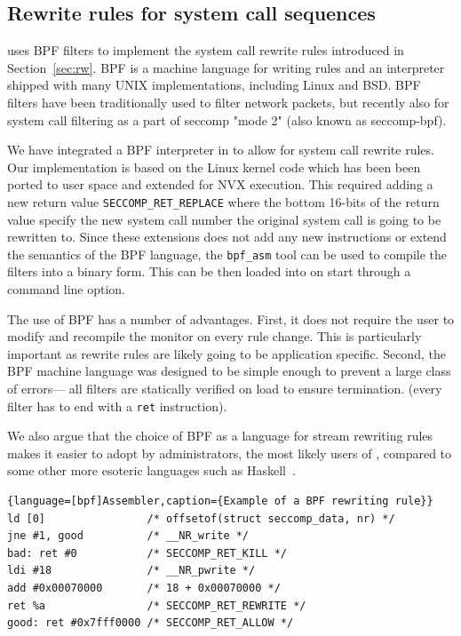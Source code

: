 
\subsection{Rewrite rules for system call sequences}
\label{sec:patternmatching}

\nx uses BPF filters to implement the system call rewrite rules introduced in
Section~\ref{sec:rw}.  BPF is a machine language for writing rules and an
interpreter shipped with many UNIX implementations, including Linux and BSD.
BPF filters have been traditionally used to filter network packets, but
recently also for system call filtering as a part of seccomp "mode 2" (also
known as seccomp-bpf).

We have integrated a BPF interpreter in \nx to allow for system call rewrite
rules. Our implementation is based on the Linux kernel code which has been been
ported to user space and extended for NVX execution.  This required adding a
new return value \lstinline`SECCOMP_RET_REPLACE` where the bottom 16-bits of
the return value specify the new system call number the original system call is
going to be rewritten to.  Since these extensions does not add any new
instructions or extend the semantics of the BPF language, the
\lstinline`bpf_asm` tool can be used to compile the filters into a binary form.
This can be then loaded into \nx on start through a command line option.

The use of BPF has a number of advantages.  First, it does not require
the user to modify and recompile the monitor on every rule
change. This is particularly important as rewrite rules are likely
going to be application specific. Second, the BPF machine language was
designed to be simple enough to prevent a large class of errors---\eg
all filters are statically verified on load to ensure termination.
(\ie every filter has to end with a \lstinline`ret` instruction).

We also argue that the choice of BPF as a language for stream rewriting rules
makes it easier to adopt by administrators, the most likely users of \nx,
compared to some other more esoteric languages such as Haskell~\cite{tachyon12}.

\begin{lstlisting}{language=[bpf]Assembler,caption={Example of a BPF rewriting rule}}
ld [0]                /* offsetof(struct seccomp_data, nr) */
jne #1, good          /* __NR_write */
bad: ret #0           /* SECCOMP_RET_KILL */
ldi #18               /* __NR_pwrite */
add #0x00070000       /* 18 + 0x00070000 */
ret %a                /* SECCOMP_RET_REWRITE */
good: ret #0x7fff0000 /* SECCOMP_RET_ALLOW */
\end{lstlisting}
